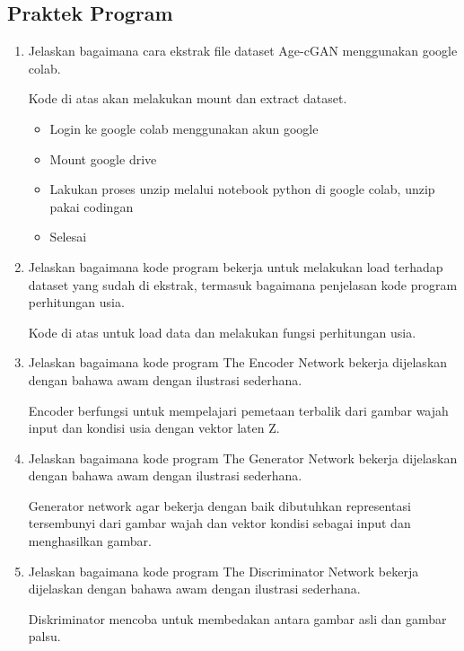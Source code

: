 \subsection{Praktek Program}
\begin{enumerate}
	\item Jelaskan bagaimana cara ekstrak file dataset Age-cGAN menggunakan google colab.
	\hfill\break

	
	Kode di atas akan melakukan mount dan extract dataset.

	\begin{itemize}
		\item Login ke google colab menggunakan akun google
		\item Mount google drive
		\item Lakukan proses unzip melalui notebook python di google colab, unzip pakai codingan
		\item Selesai
	\end{itemize}

	\item Jelaskan bagaimana kode program bekerja untuk melakukan load terhadap dataset yang sudah di ekstrak, termasuk bagaimana penjelasan kode program perhitungan usia.
	\hfill\break
	
	Kode di atas untuk load data dan melakukan fungsi perhitungan usia.
	
	\item Jelaskan bagaimana kode program The Encoder Network bekerja dijelaskan dengan bahawa awam dengan ilustrasi sederhana.
	\hfill\break
	
	Encoder berfungsi untuk mempelajari pemetaan terbalik dari gambar wajah input dan kondisi usia dengan vektor laten Z.

	\item Jelaskan bagaimana kode program The Generator Network bekerja dijelaskan dengan bahawa awam dengan ilustrasi sederhana.
	\hfill\break
	
	Generator network agar bekerja dengan baik dibutuhkan representasi tersembunyi dari gambar wajah dan vektor kondisi sebagai input dan menghasilkan gambar.

	\item Jelaskan bagaimana kode program The Discriminator Network bekerja dijelaskan dengan bahawa awam dengan ilustrasi sederhana.
	\hfill\break
	
	Diskriminator mencoba untuk membedakan antara gambar asli dan gambar palsu.


\end{enumerate}
